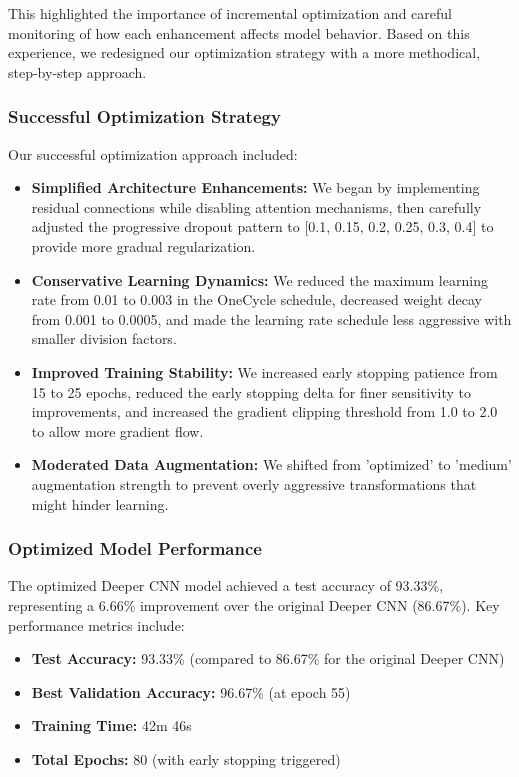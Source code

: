 This highlighted the importance of incremental optimization and careful monitoring of how each enhancement affects model behavior. Based on this experience, we redesigned our optimization strategy with a more methodical, step-by-step approach.

\subsubsection{Successful Optimization Strategy}
Our successful optimization approach included:

\begin{itemize}
    \item \textbf{Simplified Architecture Enhancements:} We began by implementing residual connections while disabling attention mechanisms, then carefully adjusted the progressive dropout pattern to [0.1, 0.15, 0.2, 0.25, 0.3, 0.4] to provide more gradual regularization.
    
    \item \textbf{Conservative Learning Dynamics:} We reduced the maximum learning rate from 0.01 to 0.003 in the OneCycle schedule, decreased weight decay from 0.001 to 0.0005, and made the learning rate schedule less aggressive with smaller division factors.
    
    \item \textbf{Improved Training Stability:} We increased early stopping patience from 15 to 25 epochs, reduced the early stopping delta for finer sensitivity to improvements, and increased the gradient clipping threshold from 1.0 to 2.0 to allow more gradient flow.
    
    \item \textbf{Moderated Data Augmentation:} We shifted from 'optimized' to 'medium' augmentation strength to prevent overly aggressive transformations that might hinder learning.
\end{itemize}

\subsubsection{Optimized Model Performance}
The optimized Deeper CNN model achieved a test accuracy of 93.33\%, representing a 6.66\% improvement over the original Deeper CNN (86.67\%). Key performance metrics include:

\begin{itemize}
    \item \textbf{Test Accuracy:} 93.33\% (compared to 86.67\% for the original Deeper CNN)
    \item \textbf{Best Validation Accuracy:} 96.67\% (at epoch 55)
    \item \textbf{Training Time:} 42m 46s
    \item \textbf{Total Epochs:} 80 (with early stopping triggered)
\end{itemize}


